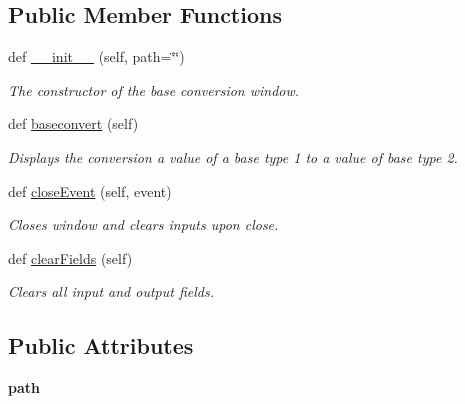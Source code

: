\subsection*{Public Member Functions}
\begin{DoxyCompactItemize}
\item 
def \hyperlink{class_conversion_base__ui_1_1_conversion_base_window_af8fe79c29cebc3c67c6260fe661872da}{\+\_\+\+\_\+init\+\_\+\+\_\+} (self, path=\char`\"{}\char`\"{})
\begin{DoxyCompactList}\small\item\em The constructor of the base conversion window. \end{DoxyCompactList}\item 
def \hyperlink{class_conversion_base__ui_1_1_conversion_base_window_af4bcf9d2cda570924af0efe9302f1c92}{baseconvert} (self)
\begin{DoxyCompactList}\small\item\em Displays the conversion a value of a base type 1 to a value of base type 2. \end{DoxyCompactList}\item 
\mbox{\label{class_conversion_base__ui_1_1_conversion_base_window_a4762fef37d9478cb281d6fd43818c14f}} 
def \hyperlink{class_conversion_base__ui_1_1_conversion_base_window_a4762fef37d9478cb281d6fd43818c14f}{close\+Event} (self, event)
\begin{DoxyCompactList}\small\item\em Closes window and clears inputs upon close. \end{DoxyCompactList}\item 
\mbox{\label{class_conversion_base__ui_1_1_conversion_base_window_a9e909a72822c1c2ed8309f5ec7878012}} 
def \hyperlink{class_conversion_base__ui_1_1_conversion_base_window_a9e909a72822c1c2ed8309f5ec7878012}{clear\+Fields} (self)
\begin{DoxyCompactList}\small\item\em Clears all input and output fields. \end{DoxyCompactList}\end{DoxyCompactItemize}
\subsection*{Public Attributes}
\begin{DoxyCompactItemize}
\item 
\mbox{\label{class_conversion_base__ui_1_1_conversion_base_window_a1951c0b3099533052162596c673e0b3d}} 
{\bfseries path}
\end{DoxyCompactItemize}


